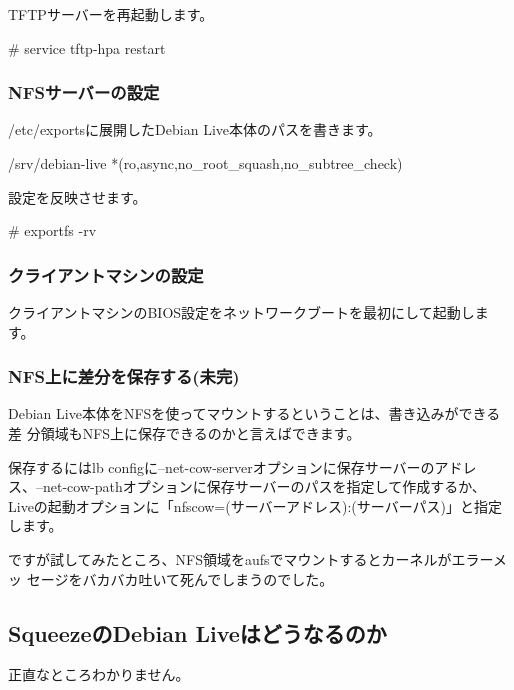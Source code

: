 \documentclass[mingoth,a4paper]{jsarticle}
\begin{document}
TFTPサーバーを再起動します。

\begin{commandline}
 # service tftp-hpa restart
\end{commandline}

\subsubsection{NFSサーバーの設定}

/etc/exportsに展開したDebian Live本体のパスを書きます。

\begin{commandline}
 /srv/debian-live *(ro,async,no_root_squash,no_subtree_check)
\end{commandline}

設定を反映させます。

\begin{commandline}
 # exportfs -rv
\end{commandline}

\subsubsection{クライアントマシンの設定}

クライアントマシンのBIOS設定をネットワークブートを最初にして起動します。

\subsubsection{NFS上に差分を保存する(未完)}

Debian Live本体をNFSを使ってマウントするということは、書き込みができる差
分領域もNFS上に保存できるのかと言えばできます。

保存するにはlb configに--net-cow-serverオプションに保存サーバーのアドレ
ス、--net-cow-pathオプションに保存サーバーのパスを指定して作成するか、
Liveの起動オプションに「nfscow=(サーバーアドレス):(サーバーパス)」と指定
します。


ですが試してみたところ、NFS領域をaufsでマウントするとカーネルがエラーメッ
セージをバカバカ吐いて死んでしまうのでした。

\subsection{SqueezeのDebian Liveはどうなるのか}
正直なところわかりません。
\end{document}
